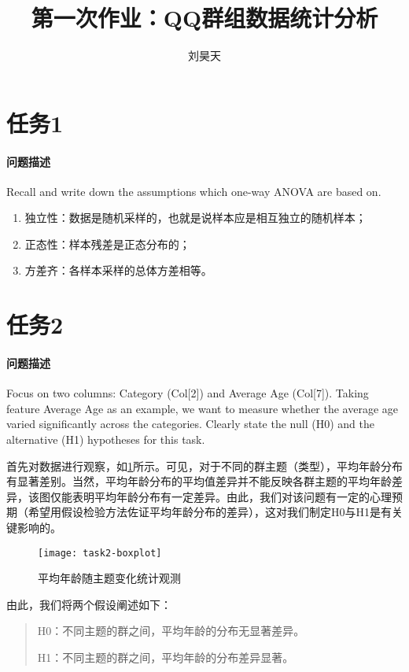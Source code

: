 \documentclass[a4paper,12pt]{article}
\title{第一次作业：QQ群组数据统计分析}
\author{刘昊天}
\begin{document}
    \maketitle
    \section{任务1} %
    \paragraph{问题描述} %
    Recall and write down the assumptions which one-way ANOVA are based on.

    \begin{enumerate}
        \item 独立性：数据是随机采样的，也就是说样本应是相互独立的随机样本；
        \item 正态性：样本残差是正态分布的；
        \item 方差齐：各样本采样的总体方差相等。
    \end{enumerate}
    \section{任务2} %
    \paragraph{问题描述} Focus on two columns: Category (Col[2]) and Average Age (Col[7]). Taking feature Average Age as an example, we want to measure whether the average age varied significantly across the categories. Clearly state the null (H0) and the alternative (H1) hypotheses for this task.

    首先对数据进行观察，如\cref{fig:task2-boxplot}所示。可见，对于不同的群主题（类型），平均年龄分布有显著差别。当然，平均年龄分布的平均值差异并不能反映各群主题的平均年龄差异，该图仅能表明平均年龄分布有一定差异。由此，我们对该问题有一定的心理预期（希望用假设检验方法佐证平均年龄分布的差异），这对我们制定H0与H1是有关键影响的。
    \begin{figure}[htbp]
        \centering
        \texttt{[image: task2-boxplot]}
        \caption{平均年龄随主题变化统计观测}
        \label{fig:task2-boxplot}
    \end{figure}

    由此，我们将两个假设阐述如下：
    \begin{quote}
        H0：不同主题的群之间，平均年龄的分布无显著差异。

        H1：不同主题的群之间，平均年龄的分布差异显著。
    \end{quote}
\end{document}
